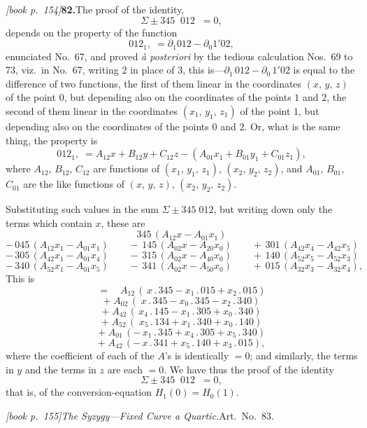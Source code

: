 \documentclass[11pt,a4paper]{article}
\theoremstyle{plain}
\theoremstyle{definition}
\theoremstyle{remark}
\begin{document}
\medskip\noindent\textit{[book p.~154]}\quad \textbf{82.}\quad The proof of the identity,
\[
\Sigma \pm 345\;\;\boxed{012}\;\; = 0,
\]
depends on the property of the function
\[
\boxed{012}_{1},\;= \partial_1 012 - \partial_0 1'02,
\]
enunciated No.\ 67, and proved \textit{à posteriori} by the tedious calculation Nos.\ 69 to 73, viz.\ in No.\ 67, writing $2$ in place of $3$, this is---$\partial_1\,012 - \partial_0\,1'02$ is equal to the difference of two functions, the first of them linear in the coordinates $(x,\,y,\,z)$ of the point $0$, but depending also on the coordinates of the points $1$ and $2$, the second of them linear in the coordinates $(x_1,\,y_1,\,z_1)$ of the point $1$, but depending also on the coordinates of the points $0$ and $2$. Or, what is the same thing, the property is
\[
\boxed{012}_{1},\;= A_{12}x + B_{12}y + C_{12}z - (A_{01}x_1 + B_{01}y_1 + C_{01}z_1),
\]
where $A_{12}$, $B_{12}$, $C_{12}$ are functions of $(x_1,\,y_1,\,z_1)$, $(x_2,\,y_2,\,z_2)$, and $A_{01}$, $B_{01}$, $C_{01}$ are the like functions of $(x,\,y,\,z)$, $(x_2,\,y_2,\,z_2)$.

Substituting such values in the sum $\Sigma \pm 345\;\boxed{012}$, but writing down only the terms which contain $x$, these are
\[
345\,(A_{12}x - A_{01}x_1)
\]
\[
-\,045\,(A_{12}x_1 - A_{01}x_1)\qquad -\,145\,(A_{02}x - A_{20}x_0)\qquad +\,301\,(A_{42}x_4 - A_{42}x_5)
\]
\[
-\,305\,(A_{42}x_1 - A_{01}x_4)\qquad -\,315\,(A_{02}x - A_{40}x_0)\qquad +\,140\,(A_{52}x_5 - A_{52}x_3)
\]
\[
-\,340\,(A_{52}x_1 - A_{01}x_5)\qquad -\,341\,(A_{02}x - A_{50}x_0)\qquad +\,015\,(A_{32}x_3 - A_{32}x_4),
\]
This is
\[
=\quad A_{12}\,(\,x\,.\,345 - x_1\,.\,015 + x_2\,.\,015)
\]
\[
+\;A_{02}\,(\;x\,.\,345 - x_0\,.\,345 - x_2\,.\,340)
\]
\[
+\;A_{42}\,(\,x_4\,.\,145 - x_1\,.\,305 + x_0\,.\,340)
\]
\[
+\;A_{52}\,(\;x_5\,.\,134 + x_1\,.\,340 + x_0\,.\,140)
\]
\[
+\;A_{01}\,(-\,x_1\,.\,345 + x_4\,.\,305 + x_5\,.\,340)
\]
\[
+\;A_{42}\,(-\,x\,.\,341 + x_5\,.\,140 + x_3\,.\,015),
\]
where the coefficient of each of the $A$'s is identically $= 0$; and similarly, the terms in $y$ and the terms in $z$ are each $= 0$. We have thus the proof of the identity
\[
\Sigma \pm 345\;\;\boxed{012}\;\; = 0,
\]
that is, of the conversion-equation $H_1(0) = H_0(1)$.

\medskip\noindent\textit{[book p.~155]}\quad \textit{The Syzygy---Fixed Curve a Quartic.}\quad Art.\ No.\ 83.
\end{document}
